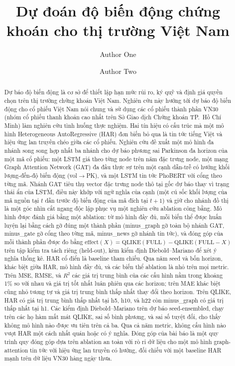 \documentclass[runningheads]{llncs}
\begin{document}
%
\title{Dự đoán độ biến động chứng khoán cho thị trường Việt Nam}
%
%
\author{Author One \and Author Two}
%
%
\maketitle
%
\begin{abstract}
Dự báo độ biến động là cơ sở để thiết lập hạn mức rủi ro, ký quỹ và định giá quyền chọn trên thị
trường chứng khoán Việt Nam. Nghiên cứu này hướng tới dự báo độ biến động cho cổ phiếu Việt Nam nói
chung và sử dụng các cổ phiếu thành phần VN30 (nhóm cổ phiếu thanh khoản cao nhất trên Sở Giao dịch
Chứng khoán TP.\ Hồ Chí Minh) làm nghiên cứu tình huống thực nghiệm. Hai tín hiệu có cấu trúc mà một
mô hình Heterogeneous AutoRegressive (HAR) đơn biến bỏ qua là tin tức tiếng Việt và hiệu ứng lan
truyền chéo giữa các cổ phiếu. Nghiên cứu đề xuất một mô hình đa nhánh song song hợp nhất ba nhánh cho
dự báo phương sai Parkinson đa horizon của một mã cổ phiếu: một LSTM giá theo từng node trên năm đặc
trưng node, một mạng Graph Attention Network (GAT) đa đầu thực sự trên một cạnh dẫn-trễ có hướng khối
lượng-đến-độ biến động (vol$\to$PK), và một LSTM tin tức PhoBERT với cổng theo từng mã. Nhánh GAT tiêu
thụ vector đặc trưng node thô tại gốc dự báo thay vì trạng thái ẩn của LSTM, điều này khớp với ngữ nghĩa
của cạnh (một cú sốc khối lượng của mã nguồn tại $t$ dẫn trước độ biến động của mã đích tại $t{+}1$) và
giữ cho nhánh đồ thị là một góc nhìn cắt ngang độc lập phục vụ một nghiên cứu ablation công bằng. Mô
hình được đánh giá bằng một ablation: từ mô hình đầy đủ, mỗi biến thể được huấn luyện lại bằng cách gỡ
đúng một thành phần (minus\_graph gỡ toàn bộ nhánh GAT, minus\_gate gỡ cổng theo từng mã, minus\_news
gỡ nhánh tin tức), và đóng góp của mỗi thành phần được đo bằng
$\text{effect}(X)=\text{QLIKE}(\text{FULL})-\text{QLIKE}(\text{FULL}{-}X)$ trên tập kiểm tra tách riêng
(held-out), kèm kiểm định Diebold--Mariano để xét ý nghĩa thống kê. HAR cổ điển là baseline tham chiếu.
Qua năm seed và bốn horizon, khác biệt giữa HAR, mô hình đầy đủ, và các biến thể ablation là nhỏ trên
mọi metric. Trên MSE, RMSE, và $R^2$ các giá trị trung bình của các cấu hình nằm trong khoảng 1\% so với
nhau và giá trị tốt nhất luân phiên qua các horizon; trên MAE khác biệt cũng nhỏ tương tự và giá trị
trung bình thấp nhất thay đổi theo horizon. Trên QLIKE, HAR có giá trị trung bình thấp nhất tại h5, h10,
và h22 còn minus\_graph có giá trị thấp nhất tại h1. Các kiểm định Diebold--Mariano trên dự báo
seed-ensembled, chạy trên các họ hàm mất mát QLIKE, sai số bình phương, và sai số tuyệt đối, cho thấy
không mô hình nào được ưu tiên trên cả ba. Qua cả năm metric, không cấu hình nào vượt HAR một cách nhất
quán hoặc có ý nghĩa. Đóng góp của bài báo là một quy trình quy đóng góp dựa trên ablation an toàn với
rò rỉ dữ liệu cho một mô hình graph-attention tin tức với hiệu ứng lan truyền có hướng, đối chiếu với một
baseline HAR mạnh trên dữ liệu VN30 hàng ngày thưa.


\end{abstract}
\end{document}
